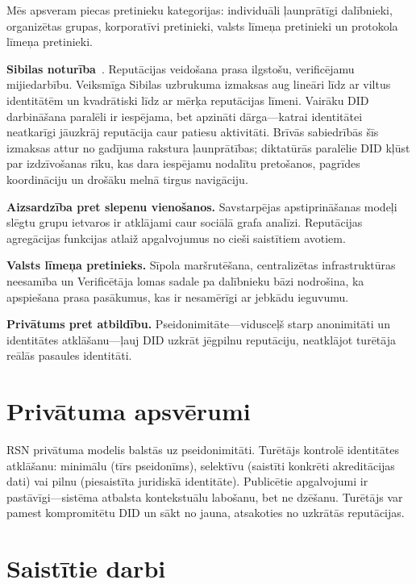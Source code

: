 \documentclass[11pt,a4paper,twocolumn]{article}
\begin{document}
Mēs apsveram piecas pretinieku kategorijas: individuāli ļaunprātīgi dalībnieki, organizētas grupas, korporatīvi pretinieki, valsts līmeņa pretinieki un protokola līmeņa pretinieki.

\textbf{Sibilas noturība}~\cite{douceur2002}. Reputācijas veidošana prasa ilgstošu, verificējamu mijiedarbību. Veiksmīga Sibilas uzbrukuma izmaksas aug lineāri līdz ar viltus identitātēm un kvadrātiski līdz ar mērķa reputācijas līmeni. Vairāku DID darbināšana paralēli ir iespējama, bet apzināti dārga---katrai identitātei neatkarīgi jāuzkrāj reputācija caur patiesu aktivitāti. Brīvās sabiedrībās šīs izmaksas attur no gadījuma rakstura ļaunprātības; diktatūrās paralēlie DID kļūst par izdzīvošanas rīku, kas dara iespējamu nodalītu pretošanos, pagrīdes koordināciju un drošāku melnā tirgus navigāciju.

\textbf{Aizsardzība pret slepenu vienošanos.} Savstarpējas apstiprināšanas modeļi slēgtu grupu ietvaros ir atklājami caur sociālā grafa analīzi. Reputācijas agregācijas funkcijas atlaiž apgalvojumus no cieši saistītiem avotiem.

\textbf{Valsts līmeņa pretinieks.} Sīpola maršrutēšana, centralizētas infrastruktūras neesamība un Verificētāja lomas sadale pa dalībnieku bāzi nodrošina, ka apspiešana prasa pasākumus, kas ir nesamērīgi ar jebkādu ieguvumu.

\textbf{Privātums pret atbildību.} Pseidonimitāte---vidusceļš starp anonimitāti un identitātes atklāšanu---ļauj DID uzkrāt jēgpilnu reputāciju, neatklājot turētāja reālās pasaules identitāti.

\section{Privātuma apsvērumi}

RSN privātuma modelis balstās uz pseidonimitāti. Turētājs kontrolē identitātes atklāšanu: minimālu (tīrs pseidonīms), selektīvu (saistīti konkrēti akreditācijas dati) vai pilnu (piesaistīta juridiskā identitāte). Publicētie apgalvojumi ir pastāvīgi---sistēma atbalsta kontekstuālu labošanu, bet ne dzēšanu. Turētājs var pamest kompromitētu DID un sākt no jauna, atsakoties no uzkrātās reputācijas.

\section{Saistītie darbi}
\end{document}
